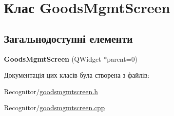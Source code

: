 \hypertarget{classGoodsMgmtScreen}{\section{Клас Goods\-Mgmt\-Screen}
\label{classGoodsMgmtScreen}
}
\subsection*{Загальнодоступні елементи}
\begin{DoxyCompactItemize}
\item 
\hypertarget{classGoodsMgmtScreen_a23df1d60103959e1b6fc32852aec9873}{{\bfseries Goods\-Mgmt\-Screen} (Q\-Widget $\ast$parent=0)}\label{classGoodsMgmtScreen_a23df1d60103959e1b6fc32852aec9873}

\end{DoxyCompactItemize}


Документація цих класів була створена з файлів\-:\begin{DoxyCompactItemize}
\item 
Recognitor/\hyperlink{goodsmgmtscreen_8h}{goodsmgmtscreen.\-h}\item 
Recognitor/\hyperlink{goodsmgmtscreen_8cpp}{goodsmgmtscreen.\-cpp}\end{DoxyCompactItemize}
